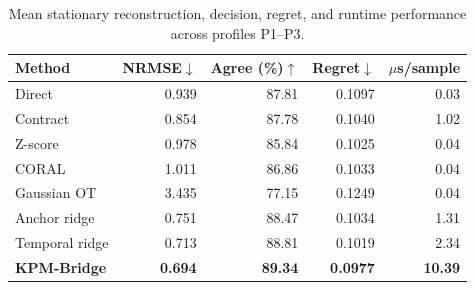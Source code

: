 
\begin{table}[t]
\caption{Mean stationary reconstruction, decision, regret, and runtime performance across profiles P1--P3.}
\label{tab:main}
\centering
\scriptsize
\setlength{\tabcolsep}{3.2pt}
\begin{tabular}{lrrrr}
\toprule
Method & NRMSE$\downarrow$ & Agree (\%)$\uparrow$ & Regret$\downarrow$ & $\mu$s/sample \\
\midrule
Direct & 0.939 & 87.81 & 0.1097 & 0.03 \\
Contract & 0.854 & 87.78 & 0.1040 & 1.02 \\
Z-score & 0.978 & 85.84 & 0.1025 & 0.04 \\
CORAL & 1.011 & 86.86 & 0.1033 & 0.04 \\
Gaussian OT & 3.435 & 77.15 & 0.1249 & 0.04 \\
Anchor ridge & 0.751 & 88.47 & 0.1034 & 1.31 \\
Temporal ridge & 0.713 & 88.81 & 0.1019 & 2.34 \\
\textbf{KPM-Bridge} & \textbf{0.694} & \textbf{89.34} & \textbf{0.0977} & \textbf{10.39} \\
\bottomrule
\end{tabular}
\end{table}
